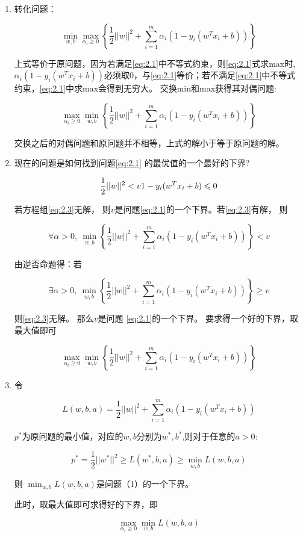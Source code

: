 \begin{enumerate}

	\item 转化问题：

\begin{equation} \label{eq:2.2}
		\min_{ w, b} \max_{\alpha_i \geqslant 0}  \left\{\frac{1}{2}|| w||^2 + \sum_{i=1}^m\alpha_i(1 - y_i( w^T x_i+b))\right\}
\end{equation}

		上式等价于原问题，因为若满足\ref{eq:2.1}中不等式约束，则\ref{eq:2.1}式求max时,$\alpha_i(1 - y_i( w^T x_i+b))$必须取0，与\ref{eq:2.1}等价；若不满足\ref{eq:2.1}中不等式约束，\ref{eq:2.1}中求max会得到无穷大。 交换min和max获得其对偶问题:

		$$
		\max_{\alpha_i \geqslant 0} \min_{ w, b}  \left\{\frac{1}{2}|| w||^2 + \sum_{i=1}^m\alpha_i(1 - y_i( w^T x_i+b))\right\}
		$$

		交换之后的对偶问题和原问题并不相等，上式的解小于等于原问题的解。

	\item 现在的问题是如何找到问题\ref{eq:2.1} 的最优值的一个最好的下界? 

\begin{equation} \label{eq:2.3}
		\frac{1}{2}|| w||^2 < v\\
		1 - y_i( w^T x_i+b) \leqslant 0
\end{equation}

		若方程组\ref{eq:2.3}无解， 则$v$是问题\ref{eq:2.1}的一个下界。若\ref{eq:2.3}有解， 则 

		$$
		\forall  \alpha >  0 , \ \min_{ w, b}  \left\{\frac{1}{2}|| w||^2 + \sum_{i=1}^m\alpha_i(1 - y_i( w^T x_i+b))\right\} < v
		$$

		由逆否命题得：若 

		$$
		\exists  \alpha >  0 , \ \min_{ w, b}  \left\{\frac{1}{2}|| w||^2 + \sum_{i=1}^m\alpha_i(1 - y_i( w^T x_i+b))\right\} \geqslant v
		$$

		则\ref{eq:2.3}无解。 那么$v$是问题 \ref{eq:2.1}的一个下界。 要求得一个好的下界，取最大值即可 

		$$
		\max_{\alpha_i \geqslant 0}  \min_{ w, b} \left\{\frac{1}{2}|| w||^2 + \sum_{i=1}^m\alpha_i(1 - y_i( w^T x_i+b))\right\}
		$$

	\item 令

		$$
		L( w, b, a) =   \frac{1}{2}|| w||^2 + \sum_{i=1}^m\alpha_i(1 - y_i( w^T x_i+b))
		$$

		$p^*$为原问题的最小值，对应的$w,b$分别为$w^*,b^*$,则对于任意的$a>0$:

		$$
		p^* = \frac{1}{2}|| w^*||^2 \geqslant  L( w^*, b, a) \geqslant \min_{ w, b} L( w, b, a)
		$$

		则 $\min_{ w, b} L( w, b, a)$是问题（1）的一个下界。

		此时，取最大值即可求得好的下界，即

		$$
		\max_{\alpha_i \geqslant 0} \min_{ w, b} L( w, b, a)
		$$
\end{enumerate}

